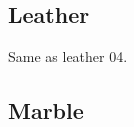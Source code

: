\clearpage
\renewcommand{\mat}{Leather}
\subsection{\mat}

\renewcommand{\Number}{01}\InputImage{\sro}{\tsm}{\sro}{\tbu}{\sro}{\tbu}
{}{}
\renewcommand{\Number}{02}\InputImage{\sro}{\tsm}{\sro}{\tbu}{\sro}{\tbu}
{}{}
\renewcommand{\Number}{03}\InputImage{\sro}{\tco}{\sro}{\tbu}{\sro}{\tbu}
{}{}
\renewcommand{\Number}{04}\InputImage{\sro}{\tsm}{\sro}{\tbu}{\sro}{\tbu}
{}{}
\renewcommand{\Number}{05}\InputImage{\sro}{\tsm}{\sro}{\tbu}{\sro}{\tbu}
{}{Same as leather 04.}
\renewcommand{\Number}{06}\InputImage{\sro}{\tsm}{\sro}{\tbu}{\sro}{\tbu}
{}{}
\renewcommand{\Number}{07}\InputImage{\sro}{\tsm}{\sro}{\tbu}{\sro}{\tbu}
{}{}
\renewcommand{\Number}{08}\InputImage{\sro}{\tsm}{\sro}{\tbu}{\sro}{\tbu}
{}{}
\renewcommand{\Number}{09}\InputImage{\sro}{\tsm}{\sro}{\tbu}{\sro}{\tbu}
{}{}
\renewcommand{\Number}{10}\InputImage{\sro}{\tsm}{\sro}{\tbu}{\sro}{\tbu}
{}{}
\renewcommand{\Number}{11}\InputImage{\sro}{\tsm}{\sro}{\tbu}{\sexor}{\tbu}
{}{}
\renewcommand{\Number}{12}\InputImage{\sro}{\tco}{\sro}{\tbu}{\sro}{\tbu}
{}{}

\clearpage
\renewcommand{\mat}{Marble}
\subsection{\mat}

\renewcommand{\Number}{01}\InputImage{\sfl}{\tsm}{\sexdi}{\tsm}{\sexdi}{\tsm}
{}{}
\renewcommand{\Number}{02}\InputImage{\sfl}{\tsm}{\sexdi}{\tsm}{\sexdi}{\tsm}
{}{}
\renewcommand{\Number}{03}\InputImage{\sfl}{\tco}{\sfl}{\tco}{\sexdi}{\tco}
{}{}
\renewcommand{\Number}{04}\InputImage{\sfl}{\tco}{\sexdi}{\tco}{\sexdi}{\tco}
{}{}
\renewcommand{\Number}{05}\InputImage{\sfl}{\tsm}{\sexdi}{\tco}{\sexdi}{\tco}
{}{}
\renewcommand{\Number}{06}\InputImage{\sexdi}{\tco}{\sexdi}{\tco}{\sexdi}{\tco}
{}{}
\renewcommand{\Number}{07}\InputImage{\sexdi}{\tco}{\sexdi}{\tco}{\sexdi}{\tco}
{}{}
\renewcommand{\Number}{08}\InputImage{\sexdi}{\tsm}{\sexdi}{\tsm}{\sexdi}{\tsm}
{}{}
\renewcommand{\Number}{09}\InputImage{\sro}{\tsm}{\sro}{\tsm}{\sro}{\tsm}
{}{}
\renewcommand{\Number}{10}\InputImage{\sfl}{\tsm}{\sexdi}{\tsm}{\sro}{\tsm}
{}{}
\renewcommand{\Number}{11}\InputImage{\sro}{\tco}{\sro}{\tco}{\sro}{\tco}
{}{}
\renewcommand{\Number}{12}\InputImage{\sfl}{\tsm}{\sexdi}{\tsm}{\sexdi}{\tsm}
{}{}

\clearpage
\renewcommand{\mat}{Scale}
